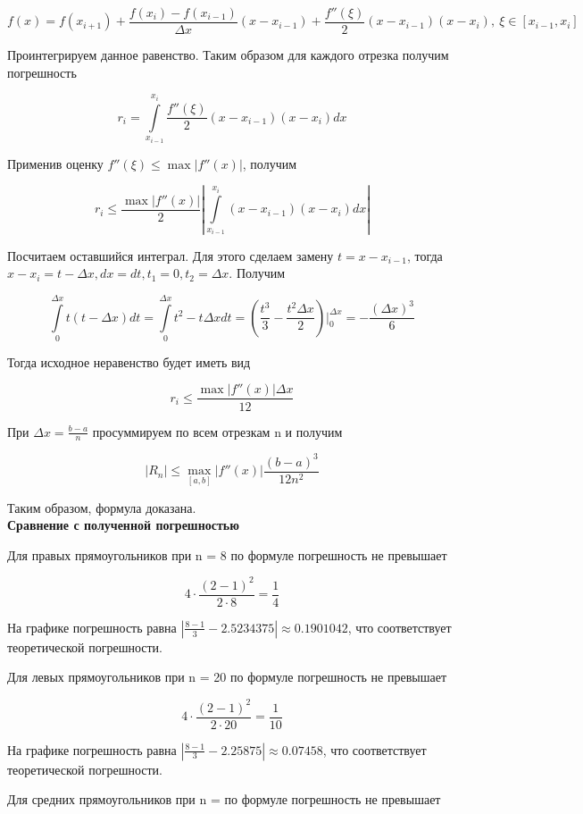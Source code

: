 \documentclass[12pt, a4paper]{report}
\begin{document}
	\[ f(x) = f(x_{i+1}) + \frac{f(x_i) - f(x_{i-1})}{\Delta x} (x - x_{i-1}) + \frac{f''(\xi)}{2}(x - x_{i-1})(x-x_i), \ \xi \in [x_{i-1}, x_i]\]
	
	Проинтегрируем данное равенство. Таким образом для каждого отрезка получим погрешность
	
	\[ r_i  = \int\limits_{x_{i-1}}^{x_i} \frac{f''(\xi)}{2}(x - x_{i-1})(x-x_i)dx\]
	
	Применив оценку $f''(\xi) \leq \max|f''(x)|$, получим
	
	\[ r_i \leq \frac{\max|f''(x)|}{2} \left| \int\limits_{x_{i-1}}^{x_i}(x - x_{i-1})(x-x_i)dx \right| \]
	
	Посчитаем оставшийся интеграл. Для этого сделаем замену $t = x - x_{i-1}$, тогда $x - x_i = t - \Delta x, dx = dt, t_1 = 0, t_2 = \Delta x$. Получим
	
	\[ \int\limits_{0}^{\Delta x} t(t-\Delta x) dt = \int\limits_{0}^{\Delta x} t^2-t\Delta x dt = \left( \frac{t^3}{3} - \frac{t^2 \Delta x}{2} \right) \Bigg|_{0}^{\Delta x} = - \frac{(\Delta x)^3}{6} \]
	
	Тогда исходное неравенство будет иметь вид
	
	\[ r_i \leq \frac{\max|f''(x)| \Delta x}{12}\]
	
	При $\Delta x = \frac{b-a}{n}$ просуммируем по всем отрезкам n и получим
	
	\[|R_n| \leq \max_{[a, b]}|f''(x)| \frac{(b-a)^3}{12n^2}\]
	
	Таким образом, формула доказана. \\
	
	\textbf{Сравнение с полученной погрешностью}
	
	Для правых прямоугольников при n = 8 по формуле погрешность не превышает
	
	\[ 4 \cdot \frac{(2 - 1)^2}{2 \cdot 8} = \frac{1}{4}\]
	
	На графике погрешность равна $\left| \frac{8 - 1}{3} - 2.5234375 \right| \approx 0.1901042$, что соответствует теоретической погрешности.
	
	Для левых прямоугольников при n = 20 по формуле погрешность не превышает
	
	\[ 4 \cdot \frac{(2 - 1)^2}{2 \cdot 20} = \frac{1}{10}\]
	
	На графике погрешность равна $\left| \frac{8 - 1}{3} - 2.25875 \right| \approx 0.07458$, что соответствует теоретической погрешности.
	
	Для средних прямоугольников при n =  по формуле погрешность не превышает
	
\end{document}
